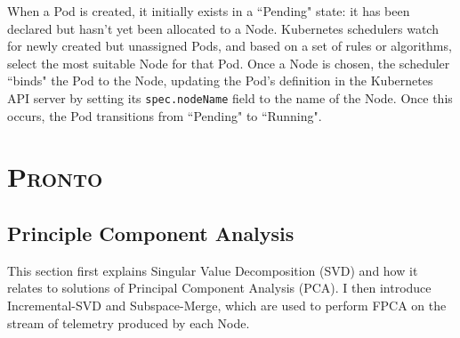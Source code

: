 When a Pod is created, it initially exists in a ``Pending" state: it has been
declared but hasn't yet been allocated to a Node. Kubernetes schedulers watch for
newly created but unassigned Pods, and based on a set of
rules or algorithms, select the most suitable Node for that Pod. Once a Node is
chosen, the scheduler ``binds" the Pod to the Node, updating the Pod's definition
in the Kubernetes API server by setting its \verb|spec.nodeName| field to the
name of the Node. Once this occurs, the Pod transitions from ``Pending" to
``Running".

\section{\protect\textsc{Pronto}}

\subsection{Principle Component Analysis}
This section first explains Singular Value Decomposition (SVD) and how it
relates to solutions of Principal Component Analysis (PCA). I then introduce
Incremental-SVD and Subspace-Merge, which are used to perform FPCA on the stream
of telemetry produced by each Node.

